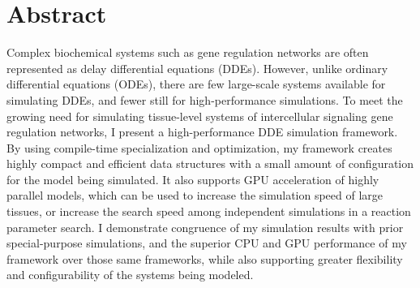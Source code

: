 \documentclass[../thesis.tex]{subfiles}
\begin{document}
\chapter*{Abstract}
Complex biochemical systems such as gene regulation networks are often represented as delay differential equations (DDEs). However, unlike ordinary differential equations (ODEs), there are few large-scale systems available for simulating DDEs, and fewer still for high-performance simulations. To meet the growing need for simulating tissue-level systems of intercellular signaling gene regulation networks, I present a high-performance DDE simulation framework. By using compile-time specialization and optimization, my framework creates highly compact and efficient data structures with a small amount of configuration for the model being simulated. It also supports GPU acceleration of highly parallel models, which can be used to increase the simulation speed of large tissues, or increase the search speed among independent simulations in a reaction parameter search. I demonstrate congruence of my simulation results with prior special-purpose simulations, and the superior CPU and GPU performance of my framework over those same frameworks, while also supporting greater flexibility and configurability of the systems being modeled.
\end{document}
